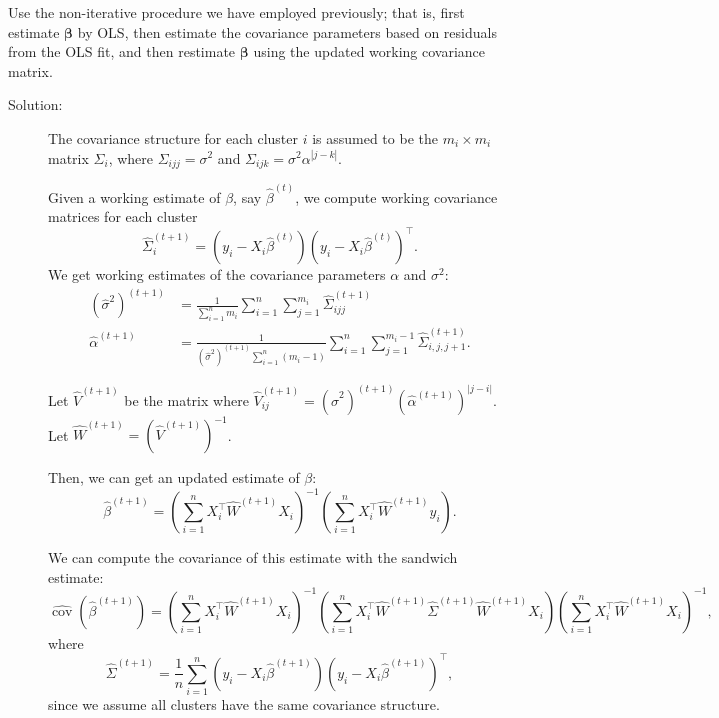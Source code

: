 \documentclass[11pt, letterpaper]{article}
\newcommand{\bbeta}{{\bm \beta}}
\begin{document}
\begin{enumerate}[(a)]
{\em \item Use the non-iterative procedure we have employed previously; that is, first estimate $\bbeta$ by OLS, then estimate the covariance parameters based on residuals from the OLS fit, and then restimate $\bbeta$ 
  using the updated working covariance matrix. }

\begin{description}
\item[Solution:] The covariance structure for each cluster $i$ is assumed to be
  the $m_i \times m_i$ matrix $\Sigma_i$, where $\Sigma_{ijj} = \sigma^2$ and
  $\Sigma_{ijk} = \sigma^2\alpha^{\left\lvert j - k\right\rvert}$.

  Given a working estimate of $\beta$, say $\hat{\beta}^{(t)}$, we compute
  working covariance matrices for each cluster
  \[\hat{\Sigma}_i^{(t + 1)} = \left(y_i - X_i\hat{\beta}^{(t)}\right)\left(y_i -
      X_i\hat{\beta}^{(t)}\right)^\intercal.\] We get working estimates of the
  covariance parameters $\alpha$ and $\sigma^2$:
  \begin{align*}
    \left(\hat{\sigma}^2\right)^{(t + 1)}
    &= \frac{1}{\sum_{i=1}^nm_i}\sum_{i=1}^n\sum_{j=1}^{m_i}\hat{\Sigma}_{ijj}^{(t + 1)} \\
    \hat{\alpha}^{(t + 1)}
    &= \frac{1}{\left(\hat{\sigma}^2\right)^{(t + 1)}\sum_{i=1}^n\left(m_i - 1\right)}
      \sum_{i=1}^n\sum_{j=1}^{m_i-1}\hat{\Sigma}_{i,j,j+1}^{(t + 1)}.
  \end{align*}


  Let $\hat{V}^{(t+1)}$ be the matrix where
  $\hat{V}_{ij}^{(t+1)} = \left(\hat{\sigma}^2\right)^{(t+1)}
  \left(\hat{\alpha}^{(t+1)}\right)^{\lvert j - i\rvert}$. Let
  $\hat{W}^{(t+1)} = \left(\hat{V}^{(t+1)}\right)^{-1}$.

  Then, we
  can get an updated estimate of $\beta$:
  \begin{equation}
    \hat{\beta}^{(t+1)} =
    \left(
      \sum_{i=1}^n X_i^\intercal \hat{W}^{(t+1)} X_i
    \right)^{-1}
    \left(
      \sum_{i=1}^n X_i^\intercal \hat{W}^{(t+1)} y_i
    \right).
  \end{equation}

  We can compute the covariance of this estimate with the sandwich estimate:
  \begin{equation}
    \hat{\operatorname{cov}}\left(
      \hat{\beta}^{(t+1)}
    \right) =
    \left(
      \sum_{i=1}^n X_i^\intercal \hat{W}^{(t+1)} X_i
    \right)^{-1}
    \left(
      \sum_{i=1}^n X_i^\intercal \hat{W}^{(t+1)} 
      \hat{\Sigma}^{(t+1)}
      \hat{W}^{(t+1)} 
      X_i
    \right)
    \left(
      \sum_{i=1}^n X_i^\intercal \hat{W}^{(t+1)} X_i
    \right)^{-1},
    \label{eqn:sandwich_estimate}
  \end{equation}
  where \[
    \hat{\Sigma}^{(t+1)} = \frac{1}{n}\sum_{i=1}^n
    \left(y_i - X_i\hat{\beta}^{(t+1)}\right)
    \left(y_i - X_i\hat{\beta}^{(t+1)}\right)^\intercal,
  \]
  since we assume all clusters have the same covariance structure.


\end{description}
\end{enumerate}
\end{document}
